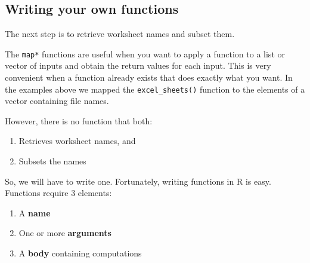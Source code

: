 \documentclass[]{book}
\newenvironment{Shaded}{\begin{snugshade}}{\end{snugshade}}
\newcommand{\KeywordTok}[1]{\textcolor[rgb]{0.13,0.29,0.53}{\textbf{#1}}}
\newcommand{\DataTypeTok}[1]{\textcolor[rgb]{0.13,0.29,0.53}{#1}}
\newcommand{\DecValTok}[1]{\textcolor[rgb]{0.00,0.00,0.81}{#1}}
\newcommand{\StringTok}[1]{\textcolor[rgb]{0.31,0.60,0.02}{#1}}
\newcommand{\CommentTok}[1]{\textcolor[rgb]{0.56,0.35,0.01}{\textit{#1}}}
\newcommand{\ControlFlowTok}[1]{\textcolor[rgb]{0.13,0.29,0.53}{\textbf{#1}}}
\newcommand{\OperatorTok}[1]{\textcolor[rgb]{0.81,0.36,0.00}{\textbf{#1}}}
\newcommand{\NormalTok}[1]{#1}
\providecommand{\tightlist}{%
  \setlength{\itemsep}{0pt}\setlength{\parskip}{0pt}}
\begin{document}
\subsection{Writing your own
functions}\label{writing-your-own-functions}

The next step is to retrieve worksheet names and subset them.

The \texttt{map*} functions are useful when you want to apply a function
to a list or vector of inputs and obtain the return values for each
input. This is very convenient when a function already exists that does
exactly what you want. In the examples above we mapped the
\texttt{excel\_sheets()} function to the elements of a vector containing
file names.

However, there is no function that both:

\begin{enumerate}
\def\labelenumi{\arabic{enumi}.}
\tightlist
\item
  Retrieves worksheet names, and
\item
  Subsets the names
\end{enumerate}

So, we will have to write one. Fortunately, writing functions in R is
easy. Functions require 3 elements:

\begin{enumerate}
\def\labelenumi{\arabic{enumi}.}
\tightlist
\item
  A \textbf{name}
\item
  One or more \textbf{arguments}
\item
  A \textbf{body} containing computations
\end{enumerate}

\begin{Shaded}
\end{Shaded}
\end{document}
